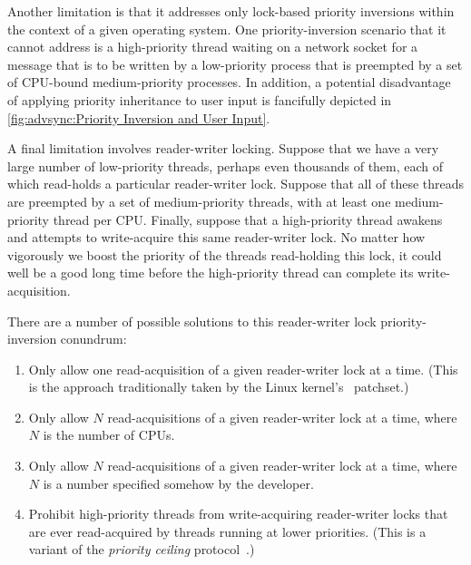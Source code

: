 Another limitation is that it addresses only lock-based priority
inversions within the context of a given operating system.
One priority-inversion scenario that it cannot address is a high-priority
thread waiting on a network socket for a message that is to be written
by a low-priority process that is preempted by a set of CPU-bound
medium-priority processes.
In addition, a potential disadvantage of applying priority inheritance
to user input is fancifully depicted in
\cref{fig:advsync:Priority Inversion and User Input}.

A final limitation involves reader-writer locking.
Suppose that we have a very large number of low-priority threads, perhaps
even thousands of them, each
of which read-holds a particular reader-writer lock.
Suppose that all of these threads are preempted by a set of medium-priority
threads, with at least one medium-priority thread per CPU\@.
Finally, suppose that a high-priority thread awakens and attempts to
write-acquire this same reader-writer lock.
No matter how vigorously we boost the priority of the threads read-holding
this lock, it could well be a good long time before the high-priority
thread can complete its write-acquisition.

There are a number of possible solutions to this reader-writer lock
priority-inversion conundrum:

\begin{enumerate}
\item	Only allow one read-acquisition of a given reader-writer lock
	at a time.
	(This is the approach traditionally taken by the Linux
	kernel's \rt\ patchset.)
\item	Only allow $N$ read-acquisitions of a given reader-writer lock
	at a time, where $N$ is the number of CPUs.
\item	Only allow $N$ read-acquisitions of a given reader-writer lock
	at a time, where $N$ is a number specified somehow by the
	developer.
\item	Prohibit high-priority threads from write-acquiring reader-writer
	locks that are ever read-acquired by threads running at lower
	priorities.
	(This is a variant of the \emph{priority ceiling}
	protocol~\cite{LuiSha1990PriorityInheritance}.)
\end{enumerate}

